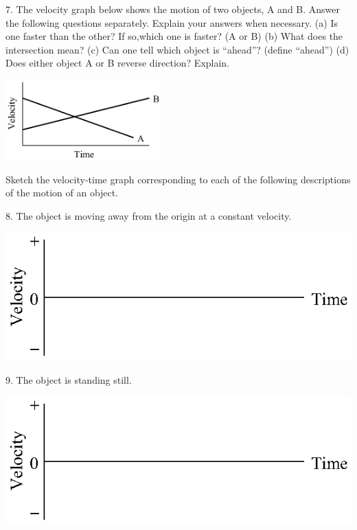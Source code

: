 7. The velocity graph below shows the motion of two objects, A and B. Answer
the following questions separately. Explain your answers when necessary. (a)
Is one faster than the other? If so,which one is faster? (A or B) (b) What does
the intersection mean? (c) Can one tell which object is ``ahead''?
(define ``ahead'') (d) Does either object A or B reverse direction?
Explain.

\vspace{0.3cm}
{\par\raggedright \includegraphics[width=0.45\textwidth]{velocity/velocity_fig14.eps} \par}
\answerspace{0.6cm}

\pagebreak[2]
Sketch the velocity-time graph corresponding to each of the following descriptions
of the motion of an object.

8. The object is moving away from the origin at a constant velocity.

\vspace{0.3cm}
{\par\centering \includegraphics{velocity/velocity_fig15.eps} \par}
\vspace{0.3cm}

9. The object is standing still.

\vspace{0.3cm}
{\par\centering \includegraphics{velocity/velocity_fig15.eps} \par}
\vspace{0.3cm}

